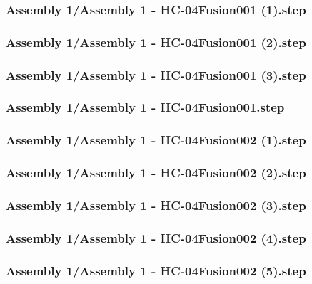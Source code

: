 \documentclass[a4paper,12pt]{article}
\begin{document}
\subsubsection{Assembly 1/Assembly 1 - HC-04Fusion001 (1).step}

\subsubsection{Assembly 1/Assembly 1 - HC-04Fusion001 (2).step}

\subsubsection{Assembly 1/Assembly 1 - HC-04Fusion001 (3).step}

\subsubsection{Assembly 1/Assembly 1 - HC-04Fusion001.step}

\subsubsection{Assembly 1/Assembly 1 - HC-04Fusion002 (1).step}

\subsubsection{Assembly 1/Assembly 1 - HC-04Fusion002 (2).step}

\subsubsection{Assembly 1/Assembly 1 - HC-04Fusion002 (3).step}

\subsubsection{Assembly 1/Assembly 1 - HC-04Fusion002 (4).step}

\subsubsection{Assembly 1/Assembly 1 - HC-04Fusion002 (5).step}

\end{document}
